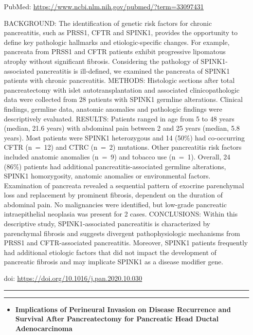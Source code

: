 \documentclass[
]{article}
\providecommand{\tightlist}{%
  \setlength{\itemsep}{0pt}\setlength{\parskip}{0pt}}
\begin{document}
PubMed: \url{https://www.ncbi.nlm.nih.gov/pubmed/?term=33097431}

BACKGROUND: The identification of genetic risk factors for chronic
pancreatitis, such as PRSS1, CFTR and SPINK1, provides the opportunity
to define key pathologic hallmarks and etiologic-specific changes. For
example, pancreata from PRSS1 and CFTR patients exhibit progressive
lipomatous atrophy without significant fibrosis. Considering the
pathology of SPINK1-associated pancreatitis is ill-defined, we examined
the pancreata of SPINK1 patients with chronic pancreatitis. METHODS:
Histologic sections after total pancreatectomy with islet
autotransplantation and associated clinicopathologic data were collected
from 28 patients with SPINK1 germline alterations. Clinical findings,
germline data, anatomic anomalies and pathologic findings were
descriptively evaluated. RESULTS: Patients ranged in age from 5 to 48
years (median, 21.6 years) with abdominal pain between 2 and 25 years
(median, 5.8 years). Most patients were SPINK1 heterozygous and 14
(50\%) had co-occurring CFTR (n~=~12) and CTRC (n~=~2) mutations. Other
pancreatitis risk factors included anatomic anomalies (n~=~9) and
tobacco use (n~=~1). Overall, 24 (86\%) patients had additional
pancreatitis-associated germline alterations, SPINK1 homozygosity,
anatomic anomalies or environmental factors. Examination of pancreata
revealed a sequential pattern of exocrine parenchymal loss and
replacement by prominent fibrosis, dependent on the duration of
abdominal pain. No malignancies were identified, but low-grade
pancreatic intraepithelial neoplasia was present for 2 cases.
CONCLUSIONS: Within this descriptive study, SPINK1-associated
pancreatitis is characterized by parenchymal fibrosis and suggests
divergent pathophysiologic mechanisms from PRSS1 and CFTR-associated
pancreatitis. Moreover, SPINK1 patients frequently had additional
etiologic factors that did not impact the development of pancreatic
fibrosis and may implicate SPINK1 as a disease modifier gene.

doi: \url{https://doi.org/10.1016/j.pan.2020.10.030}

\begin{center}\rule{0.5\linewidth}{0.5pt}\end{center}

\begin{center}\rule{0.5\linewidth}{0.5pt}\end{center}

\begin{itemize}
\tightlist
\item
  \textbf{Implications of Perineural Invasion on Disease Recurrence and
  Survival After Pancreatectomy for Pancreatic Head Ductal
  Adenocarcinoma}
\end{itemize}
\end{document}
